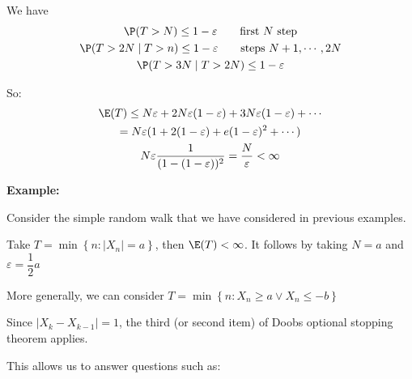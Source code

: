 \par\bigskip
\begin{prf}[]{}
  We have 
  \begin{equation*}
    \begin{gathered}
      \P(T>N)\leq 1-\varepsilon\qquad\text{first $N$ step}\\
      \P(T>2N\mid T>n)\leq 1-\varepsilon\qquad\text{steps $N+1,\cdots,2N$}\\
      \P(T>3N\mid T>2N)\leq 1-\varepsilon
    \end{gathered}
  \end{equation*}\par
  \noindent So:
  \begin{equation*}
    \begin{gathered}
      \E(T)\leq N\varepsilon+2N\varepsilon(1-\varepsilon)+3N\varepsilon(1-\varepsilon)+\cdots\\
      =N\varepsilon(1+2(1-\varepsilon)+e(1-\varepsilon)^2+\cdots)\\
      N\varepsilon\dfrac{1}{(1-(1-\varepsilon))^2} = \dfrac{N}{\varepsilon}<\infty
    \end{gathered}
  \end{equation*}
\end{prf}
\par\bigskip
\noindent\textbf{Example:}\par
\noindent Consider the simple random walk that we have considered in previous examples.\par
\noindent Take $T = \min\left\{n:\left|X_n\right|=a\right\}$, then $\E(T)<\infty$. It follows by taking $N=a$ and $\varepsilon= \dfrac{1}{2}a$
\par\bigskip
\noindent More generally, we can consider $T= \min\left\{n:X_n\geq a\vee X_n\leq -b\right\}$\par
\noindent Since $\left|X_k-X_{k-1}\right|=1$, the third (or second item) of Doobs optional stopping theorem applies.\par
\noindent This allows us to answer questions such as:\par

